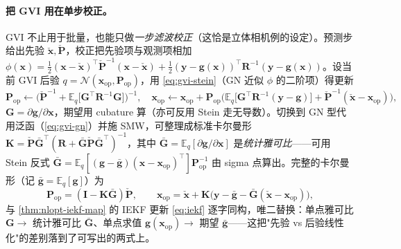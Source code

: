 \paragraph{把 GVI 用在单步校正。}
GVI 不止用于批量，也能只做\emph{一步滤波校正}（这恰是立体相机例的设定）。预测步给出先验 $\check{\mathbf{x}},\check{\mathbf{P}}$，校正把先验项与观测项相加 $\phi(\mathbf{x})=\tfrac12(\mathbf{x}-\check{\mathbf{x}})^\top\check{\mathbf{P}}^{-1}(\mathbf{x}-\check{\mathbf{x}})+\tfrac12(\mathbf{y}-\mathbf{g}(\mathbf{x}))^\top\mathbf{R}^{-1}(\mathbf{y}-\mathbf{g}(\mathbf{x}))$。设当前 GVI 后验 $q=\mathcal{N}(\mathbf{x}_{\mathrm{op}},\mathbf{P}_{\mathrm{op}})$，用 \cref{eq:gvi-stein}（GN 近似 $\phi$ 的二阶项）得更新
\begin{equation}
  \mathbf{P}_{\mathrm{op}}\leftarrow\Big(\check{\mathbf{P}}^{-1}+\mathbb{E}_q\big[\mathbf{G}^\top\mathbf{R}^{-1}\mathbf{G}\big]\Big)^{-1},\quad
  \mathbf{x}_{\mathrm{op}}\leftarrow\mathbf{x}_{\mathrm{op}}+\mathbf{P}_{\mathrm{op}}\Big(\mathbb{E}_q\big[\mathbf{G}^\top\mathbf{R}^{-1}(\mathbf{y}-\mathbf{g})\big]+\check{\mathbf{P}}^{-1}(\check{\mathbf{x}}-\mathbf{x}_{\mathrm{op}})\Big),
  \label{eq:gvi-filter}
\end{equation}
$\mathbf{G}=\partial\mathbf{g}/\partial\mathbf{x}$，期望用 cubature 算（亦可反用 Stein 走无导数）。切换到 GN 型代用泛函（\cref{eq:gvi-gn}）并施 SMW，可整理成标准卡尔曼形 $\mathbf{K}=\check{\mathbf{P}}\bar{\mathbf{G}}^\top(\mathbf{R}+\bar{\mathbf{G}}\check{\mathbf{P}}\bar{\mathbf{G}}^\top)^{-1}$，其中 $\bar{\mathbf{G}}=\mathbb{E}_q[\partial\mathbf{g}/\partial\mathbf{x}]$ 是\emph{统计雅可比}——可用 Stein 反式 $\bar{\mathbf{G}}=\mathbb{E}_q[(\mathbf{g}-\bar{\mathbf{g}})(\mathbf{x}-\mathbf{x}_{\mathrm{op}})^\top]\mathbf{P}_{\mathrm{op}}^{-1}$ 由 sigma 点算出。完整的卡尔曼形（记 $\bar{\mathbf{g}}=\mathbb{E}_q[\mathbf{g}]$）为
\begin{equation}
  \mathbf{P}_{\mathrm{op}}=(\mathbf{I}-\mathbf{K}\bar{\mathbf{G}})\check{\mathbf{P}},\qquad
  \mathbf{x}_{\mathrm{op}}=\check{\mathbf{x}}+\mathbf{K}\big(\mathbf{y}-\bar{\mathbf{g}}-\bar{\mathbf{G}}(\check{\mathbf{x}}-\mathbf{x}_{\mathrm{op}})\big),
  \label{eq:gvi-filter-kalman}
\end{equation}
与 \cref{thm:nlopt-iekf-map} 的 IEKF 更新 \cref{eq:iekf} 逐字同构，唯二替换：单点雅可比 $\mathbf{G}\to$ 统计雅可比 $\bar{\mathbf{G}}$、单点求值 $\mathbf{g}(\mathbf{x}_{\mathrm{op}})\to$ 期望 $\bar{\mathbf{g}}$——这把"先验 vs 后验线性化"的差别落到了可写出的两式上。

